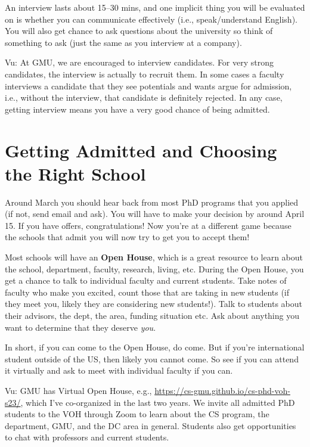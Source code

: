 \documentclass[11pt]{article}
\newenvironment{commentbox}{
 \small
    \begin{cbox}
 }{
   \end{cbox}
}
\begin{document}
An interview lasts about 15--30 mins, and one implicit thing you will be evaluated on is whether you can communicate effectively (i.e., speak/understand English).  You will also get chance to ask questions about the university so think of something to ask (just the same as you interview at a company).

\begin{commentbox}
Vu: At GMU, we are encouraged to interview candidates. For very strong candidates, the interview is actually to recruit them.  In some cases a faculty interviews a candidate that they see potentials and wants argue for admission, i.e., without the interview, that candidate is definitely rejected. In any case, getting interview means you have a very good chance of being admitted.
\end{commentbox}

\section{Getting Admitted and Choosing the Right School}

Around March you should hear back from most PhD programs that you applied (if not, send email and ask). You will have to make your decision by around April 15.
If you have offers, congratulations!  Now you're at a different game because the schools that admit you will now try to get you to accept them!  

Most schools will have an \textbf{Open House}, which is a great resource to learn about the school, department, faculty, research, living, etc. During the Open House, you get a chance to talk to individual faculty and current students.  Take notes of faculty who make you excited, count those that are taking in new students (if they meet you, likely they are considering new students!).  Talk to students about their advisors, the dept, the area, funding situation etc.  Ask about anything you want to determine that they deserve \emph{you}.

In short, if you can come to the Open House, do come.  But if you're international student outside of the US, then likely you cannot come.  So see if you can attend it virtually and ask to meet with individual faculty if you can.

\begin{commentbox}
Vu: GMU has Virtual Open House, e.g., \url{https://cs-gmu.github.io/cs-phd-voh-s23/}, which I've co-organized in the last two years. We invite all admitted PhD students to the VOH through Zoom to learn about the CS program, the department, GMU, and the DC area in general. Students also get opportunities to chat with professors and current students.
\end{commentbox}
\end{document}
